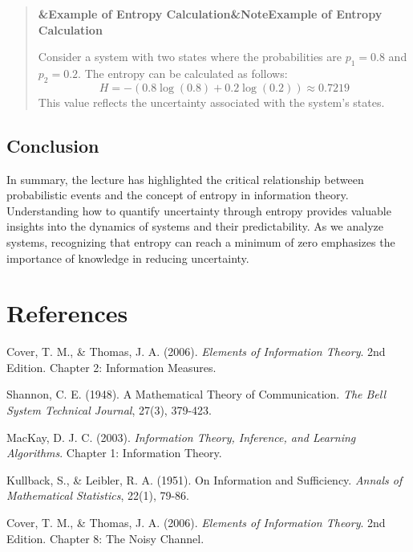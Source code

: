 \documentclass[a4paper]{article}
\newcommand{\boxheading}[1]{%
  \par\smallskip
  \noindent\textbf{\ifx&#1&Note\else#1\fi}\par
  \smallskip
}
\newenvironment{exbox}[1][]{%
  \begin{quote}\color{brown!70!black}\boxheading{#1}\normalcolor
}{\end{quote}}
\begin{document}
\begin{exbox}[Example of Entropy Calculation]
Consider a system with two states where the probabilities are \( p_1 = 0.8 \) and \( p_2 = 0.2 \). The entropy can be calculated as follows:
\begin{equation}
H = - (0.8 \log(0.8) + 0.2 \log(0.2)) \approx 0.7219
\end{equation}
This value reflects the uncertainty associated with the system's states.
\end{exbox}

\subsection{Conclusion}
In summary, the lecture has highlighted the critical relationship between probabilistic events and the concept of entropy in information theory. Understanding how to quantify uncertainty through entropy provides valuable insights into the dynamics of systems and their predictability. As we analyze systems, recognizing that entropy can reach a minimum of zero emphasizes the importance of knowledge in reducing uncertainty.

\section{References}
Cover, T. M., \& Thomas, J. A. (2006). \textit{Elements of Information Theory}. 2nd Edition. Chapter 2: Information Measures.

Shannon, C. E. (1948). A Mathematical Theory of Communication. \textit{The Bell System Technical Journal}, 27(3), 379-423.

MacKay, D. J. C. (2003). \textit{Information Theory, Inference, and Learning Algorithms}. Chapter 1: Information Theory.

Kullback, S., \& Leibler, R. A. (1951). On Information and Sufficiency. \textit{Annals of Mathematical Statistics}, 22(1), 79-86.

Cover, T. M., \& Thomas, J. A. (2006). \textit{Elements of Information Theory}. 2nd Edition. Chapter 8: The Noisy Channel.
\end{document}
